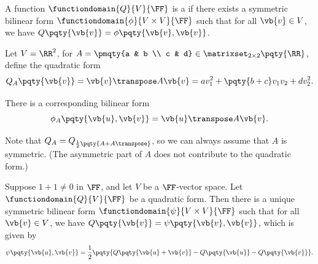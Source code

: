 \begin{definition}
    A function \(\functiondomain{Q}{V}{\FF}\) is a  if there exists a symmetric bilinear form \(\functiondomain{\phi}{V \times V}{\FF}\) such that for all \(\vb{v} \in V\), we have \(Q\pqty{\vb{v}} = \phi\pqty{\vb{v}, \vb{v}}\).
\end{definition}

\begin{example}
    Let \(V = \RR^2\), for \(A = \pmqty{a & b \\ c & d} \in \matrixset_{2 \times 2} \pqty{\RR}\), define the quadratic form
    \[
        Q_A \pqty{\vb{v}} = \vb{v}\transpose A \vb{v} = a v_1^2 + \pqty{b + c} v_1 v_2 + d v_2^2.
    \]

    There is a corresponding bilinear form
    \[
        \phi_A \pqty{\vb{u}, \vb{v}} = \vb{u}\transpose A \vb{v}.
    \]

    Note that \(Q_A = Q_{\frac{1}{2} \pqty{A + A\transpose}}\), so we can always assume that \(A\) is symmetric. (The asymmetric part of \(A\) does not contribute to the quadratic form.)
\end{example}

\begin{proposition}
    \label{prop:polarisation-identity}%
    Suppose \(1 + 1 \neq 0\) in \(\FF\), and let \(V\) be a \(\FF\)-vector space. Let \(\functiondomain{Q}{V}{\FF}\) be a quadratic form. Then there is a unique symmetric bilinear form \(\functiondomain{\psi}{V \times V}{\FF}\) such that for all \(\vb{v} \in V\), we have \(Q\pqty{\vb{v}} = \psi\pqty{\vb{v}, \vb{v}}\), which is given by
    \[
        \psi\pqty{\vb{u}, \vb{v}} = \frac{1}{2} \pqty{Q\pqty{\vb{u} + \vb{v}} - Q\pqty{\vb{u}} - Q\pqty{\vb{v}}}.
    \]
\end{proposition}

